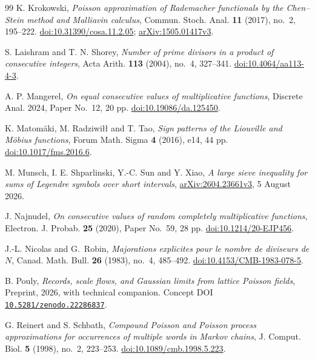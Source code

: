 \begin{thebibliography}{99}
K. Krokowski,
\emph{Poisson approximation of Rademacher functionals by the Chen--Stein
method and Malliavin calculus},
Commun. Stoch. Anal. \textbf{11} (2017), no.~2, 195--222.
\href{https://doi.org/10.31390/cosa.11.2.05}{doi:10.31390/cosa.11.2.05};
\href{https://arxiv.org/abs/1505.01417v3}{arXiv:1505.01417v3}.

S. Laishram and T. N. Shorey,
\emph{Number of prime divisors in a product of consecutive integers},
Acta Arith. \textbf{113} (2004), no.~4, 327--341.
\href{https://doi.org/10.4064/aa113-4-3}{doi:10.4064/aa113-4-3}.

A. P. Mangerel,
\emph{On equal consecutive values of multiplicative functions},
Discrete Anal. 2024, Paper No.~12, 20 pp.
\href{https://doi.org/10.19086/da.125450}{doi:10.19086/da.125450}.

K. Matom\"aki, M. Radziwi{\l}{\l} and T. Tao,
\emph{Sign patterns of the Liouville and M\"obius functions},
Forum Math. Sigma \textbf{4} (2016), e14, 44 pp.
\href{https://doi.org/10.1017/fms.2016.6}{doi:10.1017/fms.2016.6}.

M. Munsch, I. E. Shparlinski, Y.-C. Sun and Y. Xiao,
\emph{A large sieve inequality for sums of Legendre symbols over short intervals},
\href{https://arxiv.org/abs/2604.23661v3}{arXiv:2604.23661v3}, 5 August 2026.

J. Najnudel,
\emph{On consecutive values of random completely multiplicative functions},
Electron. J. Probab. \textbf{25} (2020), Paper No.~59, 28 pp.
\href{https://doi.org/10.1214/20-EJP456}{doi:10.1214/20-EJP456}.

J.-L. Nicolas and G.~Robin,
\emph{Majorations explicites pour le nombre de diviseurs de $N$},
Canad. Math. Bull. \textbf{26} (1983), no.~4, 485--492.
\href{https://doi.org/10.4153/CMB-1983-078-5}{doi:10.4153/CMB-1983-078-5}.

B. Pouly,
\emph{Records, scale flows, and Gaussian limits from lattice Poisson fields},
Preprint, 2026, with technical companion.
Concept DOI \href{https://doi.org/10.5281/zenodo.22286837}{\nolinkurl{10.5281/zenodo.22286837}}.

G. Reinert and S. Schbath,
\emph{Compound Poisson and Poisson process approximations for occurrences of multiple words in Markov chains},
J. Comput. Biol. \textbf{5} (1998), no.~2, 223--253.
\href{https://doi.org/10.1089/cmb.1998.5.223}{doi:10.1089/cmb.1998.5.223}.


\end{thebibliography}

